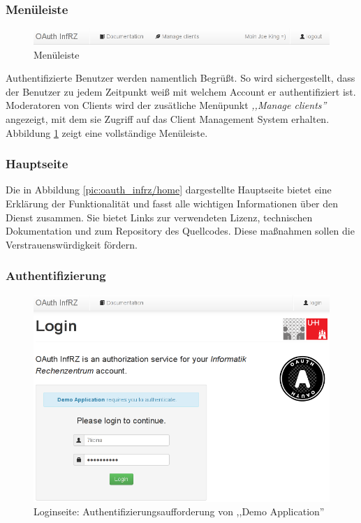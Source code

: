\documentclass[12pt,a4paper,pointednumbers,abstracton]{scrartcl}
\begin{document}
\subsubsection{Menüleiste}

\begin{figure}[h!]
\centering
\includegraphics[width=15cm]{img/oauth_infrz/navbar}
\caption{Menüleiste}
\label{pic:oauth_infrz/navbar}
\end{figure}

Authentifizierte Benutzer werden namentlich Begrüßt.
So wird sichergestellt, dass der Benutzer zu jedem Zeitpunkt weiß mit welchem Account er authentifiziert ist.
Moderatoren von Clients wird der zusätliche Menüpunkt \emph{,,Manage clients''} angezeigt, mit dem sie Zugriff auf das Client Management System erhalten.
Abbildung \ref{pic:oauth_infrz/navbar} zeigt eine vollständige Menüleiste.

\subsubsection{Hauptseite}


Die in Abbildung \ref{pic:oauth_infrz/home} dargestellte Hauptseite bietet eine Erklärung der Funktionalität und fasst alle wichtigen Informationen über den Dienst zusammen.
Sie bietet Links zur verwendeten Lizenz, technischen Dokumentation und zum Repository des Quellcodes.
Diese maßnahmen sollen die Verstrauenswürdigkeit fördern.

\subsubsection{Authentifizierung}

\begin{figure}[h!]
\centering
\includegraphics[width=15cm]{img/oauth_infrz/login_client}
\caption{Loginseite: Authentifizierungsaufforderung von ,,Demo Application''}
\label{pic:oauth_infrz/login_client}
\end{figure}
\end{document}
